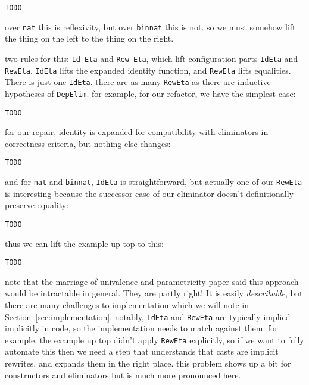 \begin{lstlisting}
TODO
\end{lstlisting}
over \lstinline{nat} this is reflexivity, but over \lstinline{binnat} this is not.
so we must somehow lift the thing on the left to the thing on the right.

two rules for this: \lstinline{Id-Eta} and \lstinline{Rew-Eta}, which lift
configuration parts \lstinline{IdEta} and \lstinline{RewEta}.
\lstinline{IdEta} lifts the expanded identity function, and \lstinline{RewEta} lifts equalities.
There is just one \lstinline{IdEta}. there are as many \lstinline{RewEta} as there are inductive hypotheses
of \lstinline{DepElim}.
for example, for our refactor, we have the simplest case:

\begin{lstlisting}
TODO
\end{lstlisting}
for our repair, identity is expanded for compatibility with eliminators in correctness criteria, but nothing else changes:

\begin{lstlisting}
TODO
\end{lstlisting}
and for \lstinline{nat} and \lstinline{binnat}, \lstinline{IdEta} is straightforward, but actually one of our \lstinline{RewEta}
is interesting because the successor case of our eliminator doesn't definitionally preserve equality:

\begin{lstlisting}
TODO
\end{lstlisting}
thus we can lift the example up top to this:

\begin{lstlisting}
TODO
\end{lstlisting}

note that the marriage of univalence and parametricity paper said this approach would be intractable in general.
They are partly right!
It is easily \textit{describable}, but there are many challenges to implementation which we will note in Section~\ref{sec:implementation}.
notably, \lstinline{IdEta} and \lstinline{RewEta} are typically implied implicitly in code, so the implementation needs to match
against them.
for example, the example up top didn't apply \lstinline{RewEta} explicitly, so if we want to fully automate this then
we need a step that understands that casts are implicit rewrites, and expands them in the right place.
this problem shows up a bit for constructors and eliminators but is much more pronounced here.


